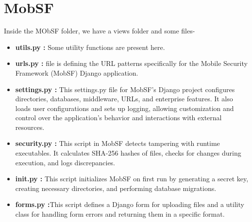 \documentclass{report}
\begin{document}
\section{MobSF}
Inside the MObSF folder, we have a views folder and some files-
\begin{itemize}
    \item \textbf\textbf{utils.py :} Some utility functions are present here.    
    \item \textbf\textbf{urls.py :} file is defining the URL patterns specifically for the Mobile Security Framework (MobSF) Django application.
    \item \textbf\textbf{settings.py :} 
    This settings.py file for MobSF's Django project configures directories, databases, middleware, URLs, and enterprise features. It also loads user configurations and sets up logging, allowing customization and control over the application's behavior and interactions with external resources.
    \item \textbf\textbf{security.py :} This script in MobSF detects tampering with runtime executables. It calculates SHA-256 hashes of files, checks for changes during execution, and logs discrepancies.
    \item \textbf\textbf{init.py :}
    This script initializes MobSF on first run by generating a secret key, creating necessary directories, and performing database migrations.
    \item \textbf\textbf{forms.py :}This script defines a Django form for uploading files and a utility class for handling form errors and returning them in a specific format.



\end{itemize}
\end{document}
